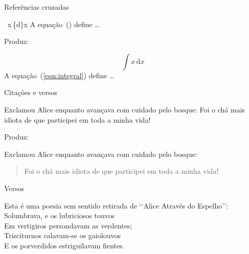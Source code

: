 \begin{frame}{Referências cruzadas}

\begin{LaTeXcode}[Exemplo]
 \n
\string\int\ x\string\,\string\mathrm\{d\}x\n
{}\n
A equação~() define \string\dots
\end{LaTeXcode}

Produz:
\begin{LaTeXoutput}
\begin{equation} \label{eqn:integral}
\int x\,\mathrm{d}x
\end{equation}
A equação~(\ref{eqn:integral}) define \dots
\end{LaTeXoutput}
\end{frame}

\begin{frame}{Citações e versos}
\begin{LaTeXcode}[Exemplo]
Exclamou Alice enquanto avançava com cuidado
pelo bosque:\n
{}\n
Foi o chá mais idiota de que participei em
toda a minha vida!\n
{}
\end{LaTeXcode}

Produz:

\begin{LaTeXoutput}
Exclamou Alice enquanto avançava com cuidado
pelo bosque:
\begin{quote}\normalfont
Foi o chá mais idiota de que participei em
toda a minha vida!
\end{quote}
\end{LaTeXoutput}
\end{frame}

\begin{frame}{Versos}
\begin{LaTeXcode}
Esta é uma poesia sem sentido retirada de
`{}`Alice Através do Espelho'{}':
\nn
{}\n
{}\n
{}\n
{}\n
Solumbrava, e os lubriciosos touvos \string\\ \n
Em vertigiros persondavam as verdentes; \string\\ \n
Trisciturnos calavam-se os gaiolouvos \string\\ \n
E os porverdidos estriguilavam fientes.\n
{}
\end{LaTeXcode}
\end{frame}

